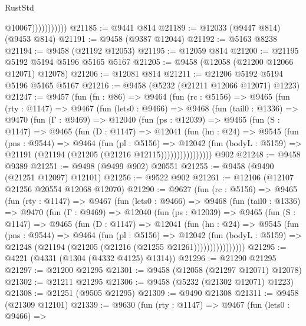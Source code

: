 \begin{lexlean}{RustStd}
\begin{coremodule}
                          @10067)))))))))))
@21185 := @9441 @814
@21189 := @12033 (@9447 @814) (@9453 @814)
@21191 := @9458 (@9387 @12044)
@21192 := @5163 @8238
@21194 := @9458 (@21192 @12053)
@21195 := @12059 @814
@21200 := @21195 @5192 @5194 @5196 @5165 @5167
@21205 := @9458 (@12058 (@21200 @12066 @12071) @12078)
@21206 := @12081 @814
@21211 := @21206 @5192 @5194 @5196 @5165 @5167
@21216 := @9458 (@5232 (@21211 @12066 @12071) @1223)
@21247 := @9457
    (fun (fn : @86) =>
    @9464
      (fun (rc : @5156) =>
      @9465
        (fun (rty : @1147) =>
        @9467
          (fun (lets0 : @9466) =>
          @9468
            (fun (tail0 : @1336) =>
            @9470
              (fun (Γ : @9469) =>
              @12040
                (fun (ps : @12039) =>
                @9465
                  (fun (S : @1147) =>
                  @9465
                    (fun (D : @1147) =>
                    @12041
                      (fun (hn : @24) =>
                      @9545
                        (fun (pns : @9544) =>
                        @9464
                          (fun (pl : @5156) =>
                          @12042
                            (fun (bodyL : @5159) =>
                            @21191 (@21194 (@21205 (@21216 @12115))))))))))))))))
    @902
@21248 := @9458 @9389
@21251 := @9498 (@9499 @902) @20551
@21255 := @9458 (@9490 (@21251 @12097) @12101)
@21256 := @9522 @902
@21261 := @12106 (@12107 @21256 @20554 @12068 @12070)
@21290 := @9627
    (fun (rc : @5156) =>
    @9465
      (fun (rty : @1147) =>
      @9467
        (fun (lets0 : @9466) =>
        @9468
          (fun (tail0 : @1336) =>
          @9470
            (fun (Γ : @9469) =>
            @12040
              (fun (ps : @12039) =>
              @9465
                (fun (S : @1147) =>
                @9465
                  (fun (D : @1147) =>
                  @12041
                    (fun (hn : @24) =>
                    @9545
                      (fun (pns : @9544) =>
                      @9464
                        (fun (pl : @5156) =>
                        @12042
                          (fun (bodyL : @5159) =>
                          @21248 (@21194 (@21205 (@21216 (@21255 @21261))))))))))))))))
@21295 := @4221 (@4331 (@1304 (@4332 @4125) @1314))
@21296 := @21290 @21295
@21297 := @21200 @21295
@21301 := @9458 (@12058 (@21297 @12071) @12078)
@21302 := @21211 @21295
@21306 := @9458 (@5232 (@21302 @12071) @1223)
@21308 := @21251 (@9505 @21295)
@21309 := @9490 @21308
@21311 := @9458 (@21309 @12101)
@21339 := @9630
    (fun (rty : @1147) =>
    @9467
      (fun (lets0 : @9466) =>

\end{coremodule}
\end{lexlean}
